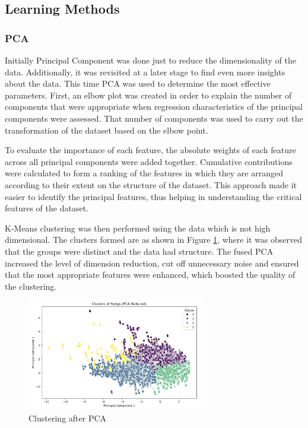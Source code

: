 \documentclass{article}
\begin{document}
\subsection{Learning Methods}

\subsubsection{PCA}

Initially Principal Component was done just to reduce the dimensionality of the data. Additionally, it was revisited at a later stage to find even more insights about the data. This time PCA was used to determine the most effective parameters. First, an elbow plot was created in order to explain the number of components that were appropriate when regression characteristics of the principal components were assessed. That number of components was used to carry out the transformation of the dataset based on the elbow point. 

To evaluate the importance of each feature, the absolute weights of each feature across all principal components were added together. Cumulative contributions were calculated to form a ranking of the features in which they are arranged according to their extent on the structure of the dataset. This approach made it easier to identify the principal features, thus helping in understanding the critical features of the dataset.

K-Means clustering was then performed using the data which is not high dimensional. The clusters formed are as shown in Figure \ref{fig:clust}, where it was observed that the groups were distinct and the data had structure. The fused PCA increased the level of dimension reduction, cut off unnecessary noise and ensured that the most appropriate features were enhanced, which boosted the quality of the clustering.
\begin{figure}[h]
\centering
\includegraphics[width=0.7\textwidth]{kmeans.png}
\caption{Clustering after PCA}
\label{fig:clust}
\end{figure}
\end{document}
